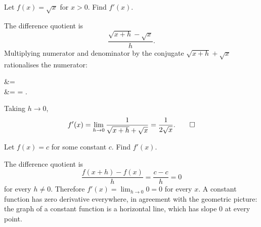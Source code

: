 \begin{workedexample}
\begin{example}\label{ex:derivative-sqrt-x}
Let \(f(x) = \sqrt{x}\) for \(x > 0\). Find \(f'(x)\).
\end{example}

\begin{solution}
The difference quotient is
\[
\frac{\sqrt{x + h} - \sqrt{x}}{h}.
\]
Multiplying numerator and denominator by the conjugate \(\sqrt{x + h} + \sqrt{x}\) rationalises the numerator:
\begin{aligneddisplay}
&=  \\
&= 
 = .
\end{aligneddisplay}
Taking \(h \to 0\),
\[
f'(x) = \lim_{h \to 0} \frac{1}{\sqrt{x + h} + \sqrt{x}}
      = \frac{1}{2\sqrt{x}}. \qedhere
\]
\end{solution}
\end{workedexample}

\begin{workedexample}
\begin{example}\label{ex:derivative-constant}
Let \(f(x) = c\) for some constant \(c\). Find \(f'(x)\).
\end{example}

\begin{solution}
The difference quotient is
\[
\frac{f(x + h) - f(x)}{h} = \frac{c - c}{h} = 0
\]
for every \(h \neq 0\). Therefore \(f'(x) = \lim_{h \to 0} 0 = 0\) for every \(x\). A constant function has zero derivative everywhere, in agreement with the geometric picture: the graph of a constant function is a horizontal line, which has slope \(0\) at every point.
\end{solution}
\end{workedexample}

